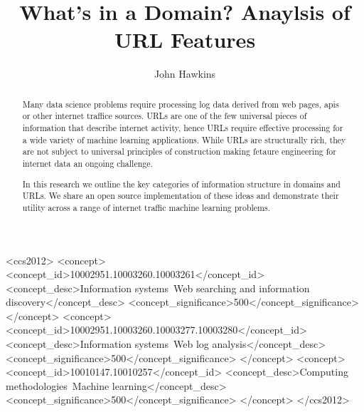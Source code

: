 \documentclass[sigconf]{acmart}
\begin{document}
\title{What's in a Domain? Anaylsis of URL Features}

\author{John Hawkins}

\renewcommand{\shortauthors}{Hawkins}

\begin{abstract}
Many data science problems require processing log data derived from web pages, apis or other
internet traffice sources. URLs are one of the few universal pieces of information that describe
internet activity, hence URLs require effective processing for a wide variety of machine 
learning applications. While URLs are structurally rich, they are not subject
to universal principles of construction making fetaure engineering for internet data an ongoing challenge.

In this research we outline the key categories of information structure in domains and URLs.
We share an open source implementation of these ideas and demonstrate their utility across a range of 
internet traffic machine learning problems.
\end{abstract}


\begin{CCSXML}
<ccs2012>
<concept>
<concept_id>10002951.10003260.10003261</concept_id>
<concept_desc>Information systems~Web searching and information discovery</concept_desc>
<concept_significance>500</concept_significance>
</concept>
<concept>
<concept_id>10002951.10003260.10003277.10003280</concept_id>
<concept_desc>Information systems~Web log analysis</concept_desc>
<concept_significance>500</concept_significance>
</concept>
<concept>
<concept_id>10010147.10010257</concept_id>
<concept_desc>Computing methodologies~Machine learning</concept_desc>
<concept_significance>500</concept_significance>
</concept>
</ccs2012>
\end{CCSXML}
\end{document}
